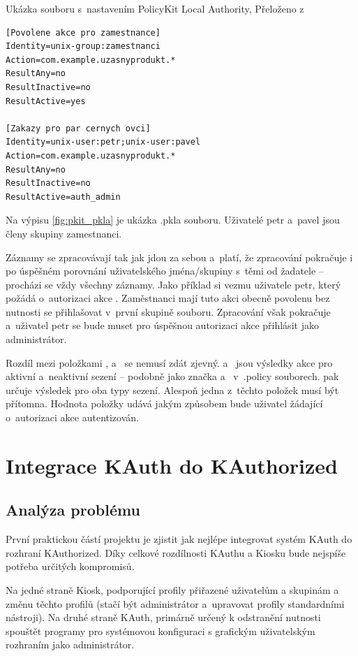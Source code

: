 \begin{mylisting}
\caption{Ukázka souboru s~nastavením PolicyKit Local Authority, Přeloženo z~\cite{manpklocalauth}}
\label{fig:pkit_pkla}
\begin{lstlisting}
[Povolene akce pro zamestnance]
Identity=unix-group:zamestnanci
Action=com.example.uzasnyprodukt.*
ResultAny=no
ResultInactive=no
ResultActive=yes

[Zakazy pro par cernych ovci]
Identity=unix-user:petr;unix-user:pavel
Action=com.example.uzasnyprodukt.*
ResultAny=no
ResultInactive=no
ResultActive=auth_admin
\end{lstlisting}
\end{mylisting}

Na výpisu \ref{fig:pkit_pkla} je ukázka .pkla souboru. Uživatelé petr a~pavel jsou členy skupiny zamestnanci.

Záznamy se zpracovávají tak jak jdou za sebou a~platí, že zpracování pokračuje i po úspěšném porovnání uživatelského jména/skupiny s~těmi od žadatele -- procházi se vždy všechny záznamy. Jako příklad si vezmu uživatele petr, který požádá o~autorizaci akce . Zaměstnanci mají tuto akci obecně povolenu bez nutnosti se přihlašovat v~první skupině souboru. Zpracování však pokračuje a~uživatel petr se bude muset pro úspěšnou autorizaci akce přihlásit jako administrátor.

Rozdíl mezi položkami ,  a~ se nemusí zdát zjevný.  a~ jsou výsledky akce pro aktivní a~neaktivní sezení -- podobně jako značka  a~ v~.policy souborech.  pak určuje výsledek pro oba typy sezení. Alespoň jedna z~těchto položek musí být přítomna. Hodnota položky udává jakým způsobem bude uživatel žádající o~autorizaci akce autentizován.

\chapter{Integrace KAuth do KAuthorized}
\section{Analýza problému}
První praktickou částí projektu je zjistit jak nejlépe integrovat systém KAuth do rozhraní KAuthorized. Díky celkové rozdílnosti KAuthu a Kiosku bude nejspíše potřeba určitých kompromisů.

Na jedné straně Kiosk, podporující profily přiřazené uživatelům a skupinám a změnu těchto profilů (stačí být administrátor a~upravovat profily standardními nástroji). Na druhé straně KAuth, primárně určený k odstranění nutnosti spouštět programy pro systémovou konfiguraci s grafickým uživatelským rozhraním jako administrátor.

